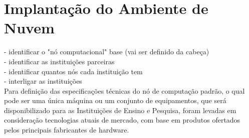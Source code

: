 \documentclass[tese,capa]{texufpel}
\begin{document}



% 

\section{Implantação do Ambiente de Nuvem}

- identificar o "nó computacional" base (vai ser definido da cabeça)\\
- identificar as instituições parceiras\\
- identificar quantos nós cada instituição tem\\
- interligar as instituições\\

Para definição das especificações técnicas do nó de computação padrão, o qual pode ser uma única máquina ou um conjunto de equipamentos, que será disponibilizado para as Instituições de Ensino e Pesquisa, foram levadas em consideração tecnologias atuais de mercado, com base em produtos ofertados pelos principais fabricantes de hardware.
\end{document}
